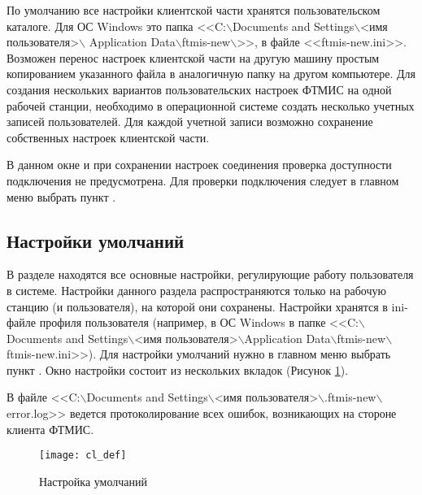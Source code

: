 \begin{prim}
 По умолчанию все настройки клиентской части хранятся пользовательском каталоге. Для ОС Windows это папка <<C:$\backslash$Documents and Settings$\backslash$<имя пользователя>$\backslash$ Application Data$\backslash$ftmis-new$\backslash$>>, в файле <<ftmis-new.ini>>. Возможен перенос настроек клиентской части на другую машину простым копированием указанного файла в аналогичную папку на другом компьютере. Для создания нескольких вариантов пользовательских настроек ФТМИС на одной рабочей станции, необходимо в операционной системе создать несколько учетных записей пользователей. Для каждой учетной записи возможно сохранение собственных настроек клиентской части.
\end{prim}

\begin{vnim}
 В данном окне и при сохранении настроек соединения проверка доступности подключения не предусмотрена. Для проверки подключения следует в главном меню выбрать пункт .
\end{vnim}

\subsection{Настройки умолчаний}

В разделе  находятся все основные настройки, регулирующие работу пользователя в системе. Настройки данного раздела распространяются только на рабочую станцию (и пользователя), на которой они сохранены. Настройки хранятся в ini-файле профиля пользователя (например, в ОС Windows в папке <<C:$\backslash$Documents and Settings$\backslash$<имя поль\-зо\-ва\-те\-ля>$\backslash$Application Data$\backslash$ftmis-new$\backslash$ftmis-new.ini>>). Для настройки умолчаний нужно в главном меню выбрать пункт . Окно настройки состоит из нескольких вкладок (Рисунок \ref{img_cl_def}).

\begin{prim}
 В файле <<C:$\backslash$Documents and Settings$\backslash$<имя поль\-зо\-ва\-те\-ля>$\backslash$.ftmis-new$\backslash$error.log>> ведется протоколирование всех ошибок, возникающих на стороне клиента ФТМИС.
\end{prim}

\begin{figure}[ht]\centering
 \texttt{[image: cl\_def]}
 \caption{Настройка умолчаний}
 \label{img_cl_def}
\end{figure} 

